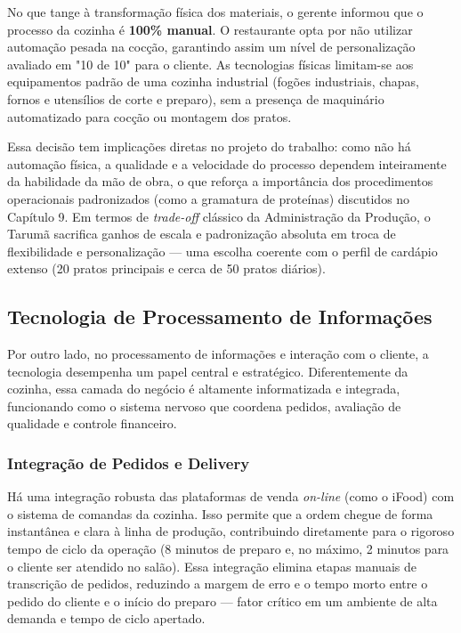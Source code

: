 \documentclass[12pt, a4paper]{article}
\begin{document}
No que tange à transformação física dos materiais, o gerente informou que o processo da cozinha é \textbf{100\% manual}. O restaurante opta por não utilizar automação pesada na cocção, garantindo assim um nível de personalização avaliado em "10 de 10" para o cliente. As tecnologias físicas limitam-se aos equipamentos padrão de uma cozinha industrial (fogões industriais, chapas, fornos e utensílios de corte e preparo), sem a presença de maquinário automatizado para cocção ou montagem dos pratos.

Essa decisão tem implicações diretas no projeto do trabalho: como não há automação física, a qualidade e a velocidade do processo dependem inteiramente da habilidade da mão de obra, o que reforça a importância dos procedimentos operacionais padronizados (como a gramatura de proteínas) discutidos no Capítulo 9. Em termos de \textit{trade-off} clássico da Administração da Produção, o Tarumã sacrifica ganhos de escala e padronização absoluta em troca de flexibilidade e personalização — uma escolha coerente com o perfil de cardápio extenso (20 pratos principais e cerca de 50 pratos diários).

\subsection{Tecnologia de Processamento de Informações}

Por outro lado, no processamento de informações e interação com o cliente, a tecnologia desempenha um papel central e estratégico. Diferentemente da cozinha, essa camada do negócio é altamente informatizada e integrada, funcionando como o sistema nervoso que coordena pedidos, avaliação de qualidade e controle financeiro.

\subsubsection{Integração de Pedidos e Delivery}
Há uma integração robusta das plataformas de venda \textit{on-line} (como o iFood) com o sistema de comandas da cozinha. Isso permite que a ordem chegue de forma instantânea e clara à linha de produção, contribuindo diretamente para o rigoroso tempo de ciclo da operação (8 minutos de preparo e, no máximo, 2 minutos para o cliente ser atendido no salão). Essa integração elimina etapas manuais de transcrição de pedidos, reduzindo a margem de erro e o tempo morto entre o pedido do cliente e o início do preparo — fator crítico em um ambiente de alta demanda e tempo de ciclo apertado.
\end{document}

